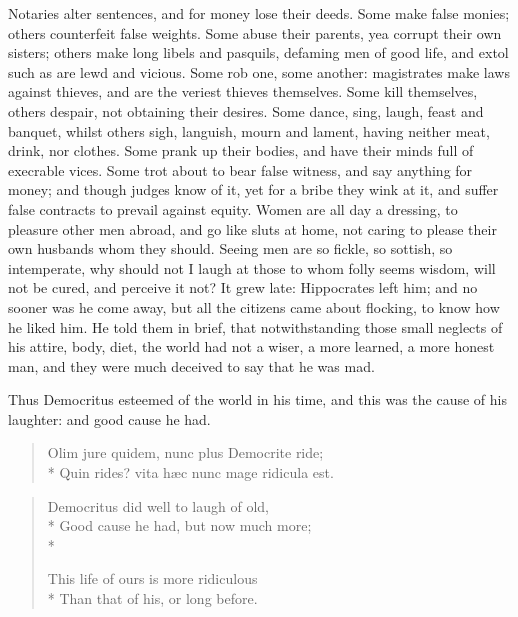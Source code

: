{Notaries alter sentences, and for money lose their deeds. Some make
false monies; others counterfeit false weights. Some abuse their
parents, yea corrupt their own sisters; others make long libels and
pasquils, defaming men of good life, and extol such as are lewd and
vicious. Some rob one, some another: magistrates make laws against
thieves, and are the veriest thieves themselves. Some kill themselves,
others despair, not obtaining their desires. Some dance, sing, laugh,
feast and banquet, whilst others sigh, languish, mourn and lament,
having neither meat, drink, nor clothes. Some prank up their
bodies, and have their minds full of execrable vices. Some trot about
to bear false witness, and say anything for money; and though
judges know of it, yet for a bribe they wink at it, and suffer false
contracts to prevail against equity. Women are all day a dressing, to
pleasure other men abroad, and go like sluts at home, not caring to
please their own husbands whom they should. Seeing men are so fickle,
so sottish, so intemperate, why should not I laugh at those to whom
folly seems wisdom, will not be cured, and perceive it not?
It grew late: Hippocrates left him; and no sooner was he come away, but
all the citizens came about flocking, to know how he liked him. He told
them in brief, that notwithstanding those small neglects of his attire,
body, diet, the world had not a wiser, a more learned, a more
honest man, and they were much deceived to say that he was mad.

Thus Democritus esteemed of the world in his time, and this was the
cause of his laughter: and good cause he had.

\begin{verse}
\textlatin{Olim jure quidem, nunc plus Democrite ride;}\\*
\textlatin{Quin rides? vita h\ae{}c nunc mage ridicula est.}
\end{verse}

\begin{verse}
Democritus did well to laugh of old,\\*
Good cause he had, but now much more;\\*

This life of ours is more ridiculous\\*
Than that of his, or long before.
\end{verse}

}
